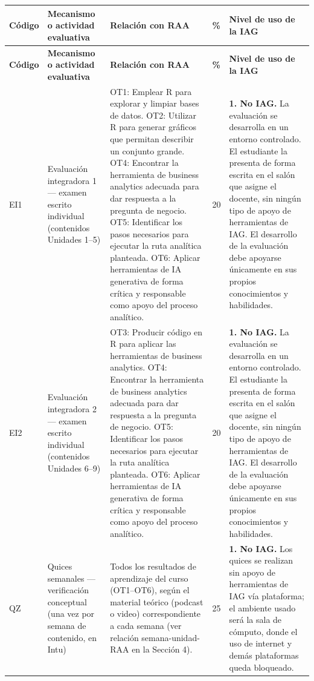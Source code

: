 \documentclass[11pt,a4paper]{article}
\begin{document}
\begin{center}
\small
\setlength{\tabcolsep}{3pt}
\begin{longtable}{|p{1.6cm}|p{2.6cm}|p{5.2cm}|p{0.8cm}|p{5.4cm}|}
\hline
\textbf{Código} & \textbf{Mecanismo o actividad evaluativa} & \textbf{Relación con RAA} & \textbf{\%} & \textbf{Nivel de uso de la IAG} \\
\hline
\endfirsthead
\hline
\textbf{Código} & \textbf{Mecanismo o actividad evaluativa} & \textbf{Relación con RAA} & \textbf{\%} & \textbf{Nivel de uso de la IAG} \\
\hline
\endhead

EI1 & Evaluación integradora 1 --- examen escrito individual (contenidos Unidades 1--5) &
OT1: Emplear R para explorar y limpiar bases de datos. OT2: Utilizar R para generar gráficos que permitan describir un conjunto grande. OT4: Encontrar la herramienta de business analytics adecuada para dar respuesta a la pregunta de negocio. OT5: Identificar los pasos necesarios para ejecutar la ruta analítica planteada. OT6: Aplicar herramientas de IA generativa de forma crítica y responsable como apoyo del proceso analítico. &
20 &
\textbf{1. No IAG.} La evaluación se desarrolla en un entorno controlado. El estudiante la presenta de forma escrita en el salón que asigne el docente, sin ningún tipo de apoyo de herramientas de IAG. El desarrollo de la evaluación debe apoyarse únicamente en sus propios conocimientos y habilidades. \\
\hline

EI2 & Evaluación integradora 2 --- examen escrito individual (contenidos Unidades 6--9) &
OT3: Producir código en R para aplicar las herramientas de business analytics. OT4: Encontrar la herramienta de business analytics adecuada para dar respuesta a la pregunta de negocio. OT5: Identificar los pasos necesarios para ejecutar la ruta analítica planteada. OT6: Aplicar herramientas de IA generativa de forma crítica y responsable como apoyo del proceso analítico. &
20 &
\textbf{1. No IAG.} La evaluación se desarrolla en un entorno controlado. El estudiante la presenta de forma escrita en el salón que asigne el docente, sin ningún tipo de apoyo de herramientas de IAG. El desarrollo de la evaluación debe apoyarse únicamente en sus propios conocimientos y habilidades. \\
\hline

QZ & Quices semanales --- verificación conceptual (una vez por semana de contenido, en Intu) &
Todos los resultados de aprendizaje del curso (OT1--OT6), según el material teórico (podcast o video) correspondiente a cada semana (ver relación semana-unidad-RAA en la Sección 4). &
25 &
\textbf{1. No IAG.} Los quices se realizan sin apoyo de herramientas de IAG vía plataforma; el ambiente usado será la sala de cómputo, donde el uso de internet y demás plataformas queda bloqueado. \\
\hline


\end{longtable}
\end{center}
\end{document}
